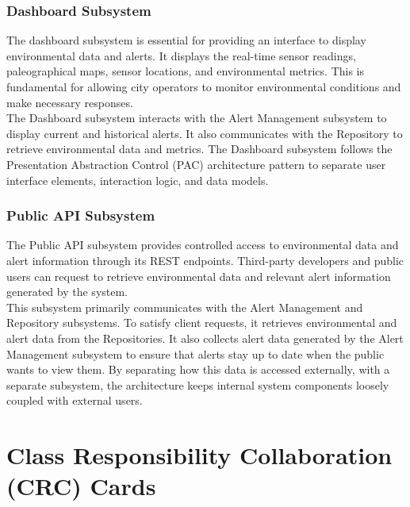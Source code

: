\documentclass[]{article}
\begin{document}
\subsubsection{Dashboard Subsystem}
The dashboard subsystem is essential for providing an interface to display environmental data and alerts. It displays the real-time sensor readings, paleographical maps, sensor locations, and environmental metrics. This is fundamental for allowing city operators to monitor environmental conditions and make necessary responses. \\

\noindent The Dashboard subsystem interacts with the Alert Management subsystem to display current and historical alerts. It also communicates with the Repository to retrieve environmental data and metrics. The Dashboard subsystem follows the Presentation Abstraction Control (PAC) architecture pattern to separate user interface elements, interaction logic, and data models. 

\subsubsection{Public API Subsystem}
The Public API subsystem provides controlled access to environmental data and alert information through its REST endpoints. Third-party developers and public users can request to retrieve environmental data and relevant alert information generated by the system. \\

\noindent This subsystem primarily communicates with the Alert Management and Repository subsystems. To satisfy client requests, it retrieves environmental and alert data from the Repositories. It also collects alert data generated by the Alert Management subsystem to ensure that alerts stay up to date when the public wants to view them. By separating how this data is accessed externally, with a separate subsystem, the architecture keeps internal system components loosely coupled with external users.

\newpage
\section{Class Responsibility Collaboration (CRC) Cards}
\label{sec:class_responsibility_collaboration_crc_cards}
\end{document}
